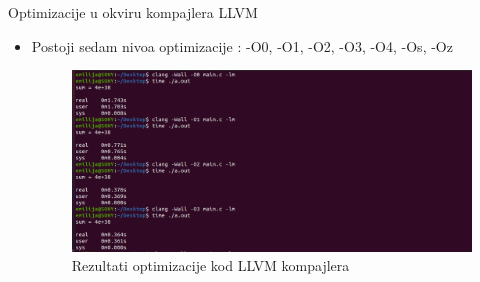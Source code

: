 \documentclass[compress, containsverbatim,mathserif, xcolor=dvipsnames, unicode]{beamer}
\begin{document}
\begin{frame}{Optimizacije u okviru kompajlera LLVM}
    \begin{itemize}
        \item Postoji sedam nivoa optimizacije : -O0, -O1, -O2, -O3, -O4, -Os, -Oz
        \begin{figure}[h!]
        \begin{center}
          \includegraphics[scale = 0.25]{../pics/test2.png}
        \end{center}
       \caption{Rezultati optimizacije kod LLVM kompajlera}
    \end{figure} 
    \end{itemize}    
\end{frame}

%
%        
\end{document}
